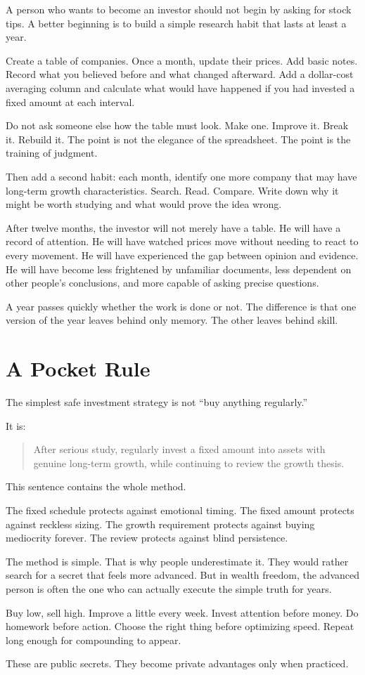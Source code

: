 A person who wants to become an investor should not begin by asking for stock tips. A better beginning is to build a simple research habit that lasts at least a year.

Create a table of companies. Once a month, update their prices. Add basic notes. Record what you believed before and what changed afterward. Add a dollar-cost averaging column and calculate what would have happened if you had invested a fixed amount at each interval.

Do not ask someone else how the table must look. Make one. Improve it. Break it. Rebuild it. The point is not the elegance of the spreadsheet. The point is the training of judgment.

Then add a second habit: each month, identify one more company that may have long-term growth characteristics. Search. Read. Compare. Write down why it might be worth studying and what would prove the idea wrong.

After twelve months, the investor will not merely have a table. He will have a record of attention. He will have watched prices move without needing to react to every movement. He will have experienced the gap between opinion and evidence. He will have become less frightened by unfamiliar documents, less dependent on other people's conclusions, and more capable of asking precise questions.

A year passes quickly whether the work is done or not. The difference is that one version of the year leaves behind only memory. The other leaves behind skill.

\section*{A Pocket Rule}

The simplest safe investment strategy is not ``buy anything regularly.''

It is:

\begin{quote}
After serious study, regularly invest a fixed amount into assets with genuine long-term growth, while continuing to review the growth thesis.
\end{quote}

This sentence contains the whole method.

The fixed schedule protects against emotional timing. The fixed amount protects against reckless sizing. The growth requirement protects against buying mediocrity forever. The review protects against blind persistence.

The method is simple. That is why people underestimate it. They would rather search for a secret that feels more advanced. But in wealth freedom, the advanced person is often the one who can actually execute the simple truth for years.

Buy low, sell high. Improve a little every week. Invest attention before money. Do homework before action. Choose the right thing before optimizing speed. Repeat long enough for compounding to appear.

These are public secrets. They become private advantages only when practiced.
